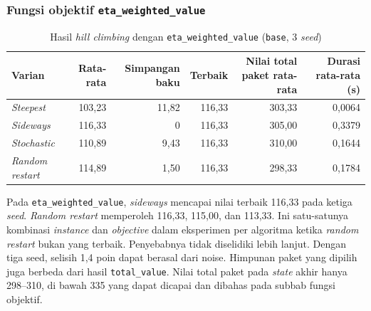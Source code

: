 \subsubsection{Fungsi objektif \texttt{eta\_weighted\_value}}
\begin{table}[H]
    \centering
    \begin{tabular}{@{}lrrrrr@{}}
        \toprule
        Varian                  & Rata-rata & Simpangan baku & Terbaik & Nilai total paket rata-rata & Durasi rata-rata (s) \\
        \midrule
        \textit{Steepest}       & 103,23    & 11,82          & 116,33  & 303,33                      & 0,0064               \\
        \textit{Sideways}       & 116,33    & 0              & 116,33  & 305,00                      & 0,3379               \\
        \textit{Stochastic}     & 110,89    & 9,43           & 116,33  & 310,00                      & 0,1644               \\
        \textit{Random restart} & 114,89    & 1,50           & 116,33  & 298,33                      & 0,1784               \\
        \bottomrule
    \end{tabular}
    \caption{Hasil \textit{hill climbing} dengan \texttt{eta\_weighted\_value} (\texttt{base}, 3 \textit{seed})}
    \label{tab:hc-eta}
\end{table}

Pada \texttt{eta\_weighted\_value}, \textit{sideways} mencapai nilai terbaik 116,33 pada ketiga \textit{seed}. \textit{Random restart} memperoleh 116,33, 115,00, dan 113,33. Ini satu-satunya kombinasi \textit{instance} dan \textit{objective} dalam eksperimen per algoritma ketika \textit{random restart} bukan yang terbaik. Penyebabnya tidak diselidiki lebih lanjut. Dengan tiga seed, selisih 1,4 poin dapat berasal dari noise. Himpunan paket yang dipilih juga berbeda dari hasil \texttt{total\_value}. Nilai total paket pada \textit{state} akhir hanya 298--310, di bawah 335 yang dapat dicapai dan dibahas pada subbab fungsi objektif.

